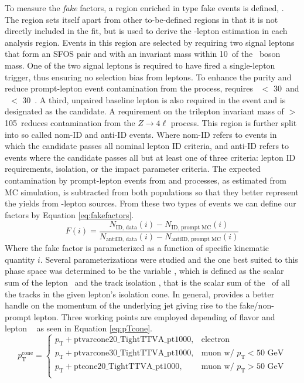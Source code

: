 To measure the \emph{fake} factors, a region enriched in \Zjets type fake events is defined, \CRZj.
The \CRZj region sets itself apart from other to-be-defined regions in that it is not directly included in the fit, but is used to derive the \fake-lepton estimation in each analysis region.
Events in this region are selected by requiring two signal leptons that form an SFOS pair and with an invariant mass within 10~\GeV of the \Zboson\ boson mass.
One of the two signal leptons is required to have fired a single-lepton trigger, thus ensuring no selection bias from \fake leptons.
To enhance the \Zjets purity and reduce prompt-lepton event contamination from the \WZ process, \CRZj requires \met\ $<$ 30~\GeV and \mT\ $<$ 30~\GeV.
A third, unpaired baseline lepton is also required in the event and is designated as the \fake candidate.
A requirement on the trilepton invariant mass of \mThreel $>$ 105~\GeV reduces contamination from the $Z\rightarrow4\ell$ process.
This region is further split into so called nom-ID and anti-ID events.
Where nom-ID refers to events in which the \fake candidate passes all nominal lepton ID criteria, and anti-ID refers to events where the \fake candidate passes all but at least one of three criteria: lepton ID requirements, isolation, or the impact parameter criteria. 
The expected contamination by prompt-lepton events from \WZ and \ZZ processes, as estimated from MC simulation, is subtracted from both populations so that they better represent the yields from \fake-lepton sources.
From these two types of events we can define our \fake factors by Equation \ref{eq:fakefactors}. 
\begin{equation}
  F(i) = \frac{N_\text{ID, data}(i) - N_\text{ID, prompt MC}(i)}{N_\text{antiID, data}(i) - N_\text{antiID, prompt MC}(i)}
  \label{eq:fakefactors}
\end{equation}
Where the fake factor is parameterized as a function of specific kinematic quantity $i$.
Several parameterizations were studied and the one best suited to this phase space was determined to be the variable \pTcone, which is defined as the scalar sum of the lepton \pt\ and the track isolation \ptiso, that is the scalar sum of the \pt\ of all the tracks in the given lepton's isolation cone.
In general, \pTcone provides a better handle on the momentum of the underlying jet giving rise to the fake/non-prompt lepton.
Three \ptiso working points are employed depending of flavor and lepton \pt~ as seen in Equation \ref{eq:pTcone}.
\begin{equation}
  p_{\text{T}}^{\text{cone}} =
  \begin{cases}
    p_{\text{T}} + \text{ptvarcone20\_TightTTVA\_pt1000}, & \text{electron } \\
    p_{\text{T}} + \text{ptvarcone30\_TightTTVA\_pt1000}, & \text{muon w/ } p_{\text{T}} < 50 \text{ GeV} \\
    p_{\text{T}} + \text{ptcone20\_TightTTVA\_pt1000}, & \text{muon w/ } p_{\text{T}} > 50 \text{ GeV} \\
  \end{cases}
  \label{eq:pTcone}
\end{equation}
